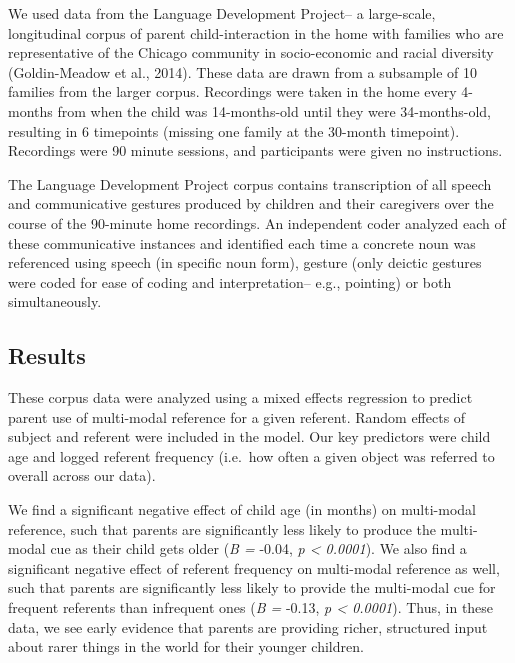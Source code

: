 \documentclass[10pt, letterpaper]{article}
\begin{document}
We used data from the Language Development Project-- a large-scale,
longitudinal corpus of parent child-interaction in the home with
families who are representative of the Chicago community in
socio-economic and racial diversity (Goldin-Meadow et al., 2014). These
data are drawn from a subsample of 10 families from the larger corpus.
Recordings were taken in the home every 4-months from when the child was
14-months-old until they were 34-months-old, resulting in 6 timepoints
(missing one family at the 30-month timepoint). Recordings were 90
minute sessions, and participants were given no instructions.

The Language Development Project corpus contains transcription of all
speech and communicative gestures produced by children and their
caregivers over the course of the 90-minute home recordings. An
independent coder analyzed each of these communicative instances and
identified each time a concrete noun was referenced using speech (in
specific noun form), gesture (only deictic gestures were coded for ease
of coding and interpretation-- e.g., pointing) or both simultaneously.

\subsection{Results}\label{results}

These corpus data were analyzed using a mixed effects regression to
predict parent use of multi-modal reference for a given referent. Random
effects of subject and referent were included in the model. Our key
predictors were child age and logged referent frequency (i.e.~how often
a given object was referred to overall across our data).

We find a significant negative effect of child age (in months) on
multi-modal reference, such that parents are significantly less likely
to produce the multi-modal cue as their child gets older (\emph{B =}
-0.04, \emph{p \textless{} 0.0001}). We also find a significant negative
effect of referent frequency on multi-modal reference as well, such that
parents are significantly less likely to provide the multi-modal cue for
frequent referents than infrequent ones (\emph{B =} -0.13, \emph{p
\textless{} 0.0001}). Thus, in these data, we see early evidence that
parents are providing richer, structured input about rarer things in the
world for their younger children.
\end{document}

